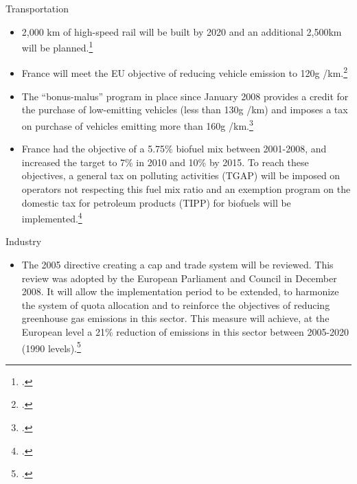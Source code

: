 Transportation
\begin{itemize}
	\item 2,000 km of high-speed rail will be built by 2020 and an additional 2,500km will be planned.\footcite[][]{GrenellePolicies}
	\item France will meet the EU objective of reducing vehicle emission to 120g /km.\footcite[][]{GrenellePolicies}
	\item The “bonus-malus” program in place since January 2008 provides a credit for the purchase of low-emitting vehicles  (less than 130g /km) and imposes a tax on purchase of vehicles emitting more than 160g /km.\footcite[][]{GrenellePolicies}
	\item France had the objective of a 5.75\% biofuel mix between 2001-2008, and increased the target to 7\% in 2010 and 10\% by 2015. To reach these objectives, a general tax on polluting activities (TGAP) will be imposed on operators not respecting this fuel mix ratio and an exemption program on the domestic tax for petroleum products (TIPP) for biofuels will be implemented.\footcite[][]{GrenellePolicies}
\end{itemize}



Industry
\begin{itemize}
	\item The 2005 directive creating a cap and trade system will be reviewed. This review was adopted by the European Parliament and Council in December 2008. It will allow the implementation period to be extended, to harmonize the system of quota allocation and to reinforce the objectives of reducing greenhouse gas emissions in this sector. This measure will achieve, at the European level a 21\% reduction of emissions in this sector between 2005-2020 (1990 levels).\footcite[][]{GrenellePolicies}
\end{itemize}



